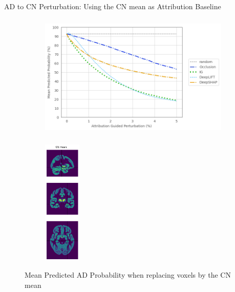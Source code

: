 \documentclass[aspectratio=169,xcolor={table, dvipsnames}]{beamer}
\begin{document}
\begin{frame}{AD to CN Perturbation: Using the CN mean as Attribution Baseline}
	\begin{figure}
		\begin{subfigure}{0.8\textwidth}
			\centering
			\includegraphics[height=6cm]{figures/3672-ad-fidelity-cn2.png}
		\end{subfigure}\hfill
		\begin{subfigure}{0.2\textwidth}
			\centering
			\includegraphics[height=6cm]{figures/cn_mean.png}
		\end{subfigure}
		\caption*{Mean Predicted AD Probability when replacing voxels by the CN mean}
	\end{figure}
\end{frame}

% 
\end{document}

